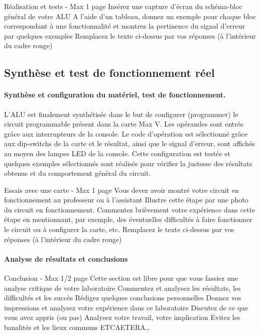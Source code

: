 \documentclass[a4paper]{article}
\begin{document}
\begin{tcolorbox}[colframe=Monokaimagenta,colback=white]
Réalisation et tests - Max 1 page 
Insérez une capture d’écran du schéma-bloc général de votre ALU
A l’aide d’un tableau, donnez un exemple pour chaque bloc correspondant à une fonctionnalité et montrez la pertinence du signal d’erreur par quelques exemples
Remplacez le texte ci-dessus par vos réponses (à l’intérieur du cadre rouge)
\end{tcolorbox}

\subsection{Synthèse et test de fonctionnement réel}
\paragraph{Synthèse et configuration du matériel, test de fonctionnement.}
L’ALU est finalement synthétisée dans le but de configurer (programmer) le circuit programmable présent dans la carte Max V. Les opérandes sont entrés grâce aux interrupteurs de la console. Le code d’opération est sélectionné grâce aux dip-switchs de la carte et le résultat, ainsi que le signal d’erreur, sont affichés au moyen des lampes LED de la console. Cette configuration est testée et quelques exemples sélectionnés sont réalisés pour vérifier la justesse des résultats obtenus et du comportement général du circuit.

\begin{tcolorbox}[colframe=Monokaimagenta,colback=white]
Essais avec une carte - Max 1 page 
Vous devez avoir montré votre circuit en fonctionnement au professeur ou à l’assistant
Illustre cette étape par une photo du circuit en fonctionnement.
Commentez brièvement votre expérience dans cette étape en mentionnant, par exemple, des éventuelles difficultés à faire fonctionner le circuit ou à configurer la carte, etc.
Remplacez le texte ci-dessus par vos réponses (à l’intérieur du cadre rouge)
\end{tcolorbox}

\paragraph{Analyse de résultats et conclusions}
\begin{tcolorbox}[colframe=Monokaimagenta,colback=white]
Conclusion - Max 1/2 page 
Cette section est libre pour que vous fassiez une analyse critique de votre laboratoire
Commentez et analysez 
les résultats, 
les difficultés et les succès
Rédigez quelques conclusions personnelles
Donnez vos impressions et analysez votre expérience dans ce laboratoire
Discutez de ce que vous avez appris (ou pas)
Analysez votre travail, votre implication
Evitez les banalités et les lieux communs
ETCAETERA…
\end{tcolorbox}
\end{document}
